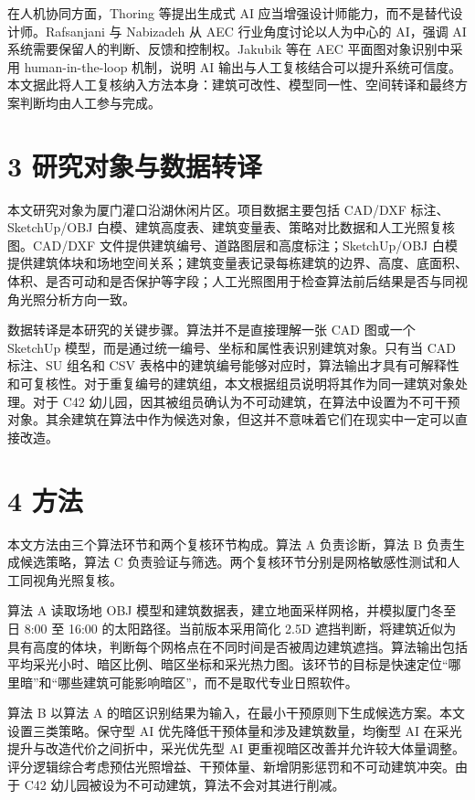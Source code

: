 \documentclass[UTF8,zihao=-4,a4paper]{ctexart}
\begin{document}
在人机协同方面，Thoring 等提出生成式 AI 应当增强设计师能力，而不是替代设计师。Rafsanjani 与 Nabizadeh 从 AEC 行业角度讨论以人为中心的 AI，强调 AI 系统需要保留人的判断、反馈和控制权。Jakubik 等在 AEC 平面图对象识别中采用 human-in-the-loop 机制，说明 AI 输出与人工复核结合可以提升系统可信度。本文据此将人工复核纳入方法本身：建筑可改性、模型同一性、空间转译和最终方案判断均由人工参与完成。

\section{3 研究对象与数据转译}
本文研究对象为厦门灌口沿湖休闲片区。项目数据主要包括 CAD/DXF 标注、SketchUp/OBJ 白模、建筑高度表、建筑变量表、策略对比数据和人工光照复核图。CAD/DXF 文件提供建筑编号、道路图层和高度标注；SketchUp/OBJ 白模提供建筑体块和场地空间关系；建筑变量表记录每栋建筑的边界、高度、底面积、体积、是否可动和是否保护等字段；人工光照图用于检查算法前后结果是否与同视角光照分析方向一致。

数据转译是本研究的关键步骤。算法并不是直接理解一张 CAD 图或一个 SketchUp 模型，而是通过统一编号、坐标和属性表识别建筑对象。只有当 CAD 标注、SU 组名和 CSV 表格中的建筑编号能够对应时，算法输出才具有可解释性和可复核性。对于重复编号的建筑组，本文根据组员说明将其作为同一建筑对象处理。对于 C42 幼儿园，因其被组员确认为不可动建筑，在算法中设置为不可干预对象。其余建筑在算法中作为候选对象，但这并不意味着它们在现实中一定可以直接改造。

\section{4 方法}
本文方法由三个算法环节和两个复核环节构成。算法 A 负责诊断，算法 B 负责生成候选策略，算法 C 负责验证与筛选。两个复核环节分别是网格敏感性测试和人工同视角光照复核。

算法 A 读取场地 OBJ 模型和建筑数据表，建立地面采样网格，并模拟厦门冬至日 8:00 至 16:00 的太阳路径。当前版本采用简化 2.5D 遮挡判断，将建筑近似为具有高度的体块，判断每个网格点在不同时间是否被周边建筑遮挡。算法输出包括平均采光小时、暗区比例、暗区坐标和采光热力图。该环节的目标是快速定位“哪里暗”和“哪些建筑可能影响暗区”，而不是取代专业日照软件。

算法 B 以算法 A 的暗区识别结果为输入，在最小干预原则下生成候选方案。本文设置三类策略。保守型 AI 优先降低干预体量和涉及建筑数量，均衡型 AI 在采光提升与改造代价之间折中，采光优先型 AI 更重视暗区改善并允许较大体量调整。评分逻辑综合考虑预估光照增益、干预体量、新增阴影惩罚和不可动建筑冲突。由于 C42 幼儿园被设为不可动建筑，算法不会对其进行削减。
\end{document}
